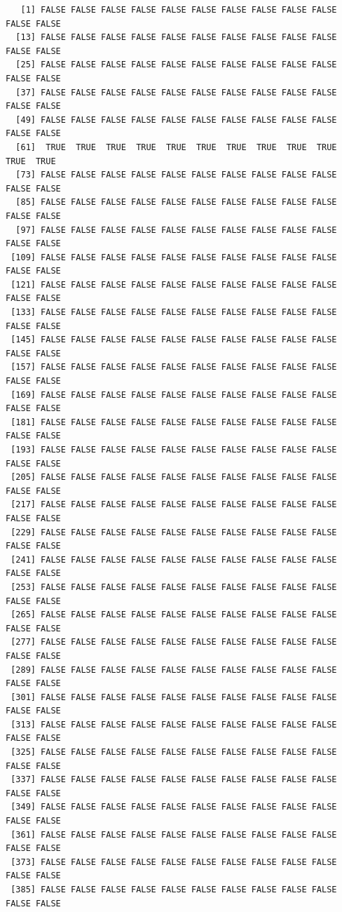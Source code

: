 \documentclass[
  letterpaper,
  DIV=11,
  numbers=noendperiod]{scrreprt}
\begin{document}
\begin{verbatim}
   [1] FALSE FALSE FALSE FALSE FALSE FALSE FALSE FALSE FALSE FALSE FALSE FALSE
  [13] FALSE FALSE FALSE FALSE FALSE FALSE FALSE FALSE FALSE FALSE FALSE FALSE
  [25] FALSE FALSE FALSE FALSE FALSE FALSE FALSE FALSE FALSE FALSE FALSE FALSE
  [37] FALSE FALSE FALSE FALSE FALSE FALSE FALSE FALSE FALSE FALSE FALSE FALSE
  [49] FALSE FALSE FALSE FALSE FALSE FALSE FALSE FALSE FALSE FALSE FALSE FALSE
  [61]  TRUE  TRUE  TRUE  TRUE  TRUE  TRUE  TRUE  TRUE  TRUE  TRUE  TRUE  TRUE
  [73] FALSE FALSE FALSE FALSE FALSE FALSE FALSE FALSE FALSE FALSE FALSE FALSE
  [85] FALSE FALSE FALSE FALSE FALSE FALSE FALSE FALSE FALSE FALSE FALSE FALSE
  [97] FALSE FALSE FALSE FALSE FALSE FALSE FALSE FALSE FALSE FALSE FALSE FALSE
 [109] FALSE FALSE FALSE FALSE FALSE FALSE FALSE FALSE FALSE FALSE FALSE FALSE
 [121] FALSE FALSE FALSE FALSE FALSE FALSE FALSE FALSE FALSE FALSE FALSE FALSE
 [133] FALSE FALSE FALSE FALSE FALSE FALSE FALSE FALSE FALSE FALSE FALSE FALSE
 [145] FALSE FALSE FALSE FALSE FALSE FALSE FALSE FALSE FALSE FALSE FALSE FALSE
 [157] FALSE FALSE FALSE FALSE FALSE FALSE FALSE FALSE FALSE FALSE FALSE FALSE
 [169] FALSE FALSE FALSE FALSE FALSE FALSE FALSE FALSE FALSE FALSE FALSE FALSE
 [181] FALSE FALSE FALSE FALSE FALSE FALSE FALSE FALSE FALSE FALSE FALSE FALSE
 [193] FALSE FALSE FALSE FALSE FALSE FALSE FALSE FALSE FALSE FALSE FALSE FALSE
 [205] FALSE FALSE FALSE FALSE FALSE FALSE FALSE FALSE FALSE FALSE FALSE FALSE
 [217] FALSE FALSE FALSE FALSE FALSE FALSE FALSE FALSE FALSE FALSE FALSE FALSE
 [229] FALSE FALSE FALSE FALSE FALSE FALSE FALSE FALSE FALSE FALSE FALSE FALSE
 [241] FALSE FALSE FALSE FALSE FALSE FALSE FALSE FALSE FALSE FALSE FALSE FALSE
 [253] FALSE FALSE FALSE FALSE FALSE FALSE FALSE FALSE FALSE FALSE FALSE FALSE
 [265] FALSE FALSE FALSE FALSE FALSE FALSE FALSE FALSE FALSE FALSE FALSE FALSE
 [277] FALSE FALSE FALSE FALSE FALSE FALSE FALSE FALSE FALSE FALSE FALSE FALSE
 [289] FALSE FALSE FALSE FALSE FALSE FALSE FALSE FALSE FALSE FALSE FALSE FALSE
 [301] FALSE FALSE FALSE FALSE FALSE FALSE FALSE FALSE FALSE FALSE FALSE FALSE
 [313] FALSE FALSE FALSE FALSE FALSE FALSE FALSE FALSE FALSE FALSE FALSE FALSE
 [325] FALSE FALSE FALSE FALSE FALSE FALSE FALSE FALSE FALSE FALSE FALSE FALSE
 [337] FALSE FALSE FALSE FALSE FALSE FALSE FALSE FALSE FALSE FALSE FALSE FALSE
 [349] FALSE FALSE FALSE FALSE FALSE FALSE FALSE FALSE FALSE FALSE FALSE FALSE
 [361] FALSE FALSE FALSE FALSE FALSE FALSE FALSE FALSE FALSE FALSE FALSE FALSE
 [373] FALSE FALSE FALSE FALSE FALSE FALSE FALSE FALSE FALSE FALSE FALSE FALSE
 [385] FALSE FALSE FALSE FALSE FALSE FALSE FALSE FALSE FALSE FALSE FALSE FALSE

\end{verbatim}
\end{document}
